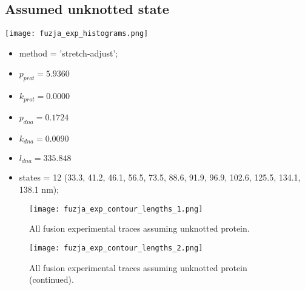 \subsection{Assumed unknotted state}
\label{subsec:fit-details-fusion-experiment-unknotted}
\begin{minipage}[c]{0.7\textwidth}
    \texttt{[image: fuzja\_exp\_histograms.png]}
\end{minipage}
\hfill
\begin{minipage}[c]{0.45\textwidth}
    \begin{itemize}
        \item method = 'stretch-adjust';
        \item $p_{prot}=5.9360$
        \item $k_{prot}=0.0000$
        \item $p_{dna}=0.1724$
        \item $k_{dna}=0.0090$
        \item $l_{dna}=335.848$
        \item states = 12 (33.3, 41.2, 46.1, 56.5, 73.5, 88.6, 91.9, 96.9, 102.6, 125.5, 134.1, 138.1 nm);
    \end{itemize}
\end{minipage}

\begin{figure}
    \centering
    \texttt{[image: fuzja\_exp\_contour\_lengths\_1.png]}
    \caption{All fusion experimental traces assuming unknotted protein.}
    \label{fig:unknotted-fusion-exp-cl1}
\end{figure}

\begin{figure}
    \centering
    \texttt{[image: fuzja\_exp\_contour\_lengths\_2.png]}
    \caption{All fusion experimental traces assuming unknotted protein (continued).}
    \label{fig:unknotted-fusion-exp-cl2}
\end{figure}

